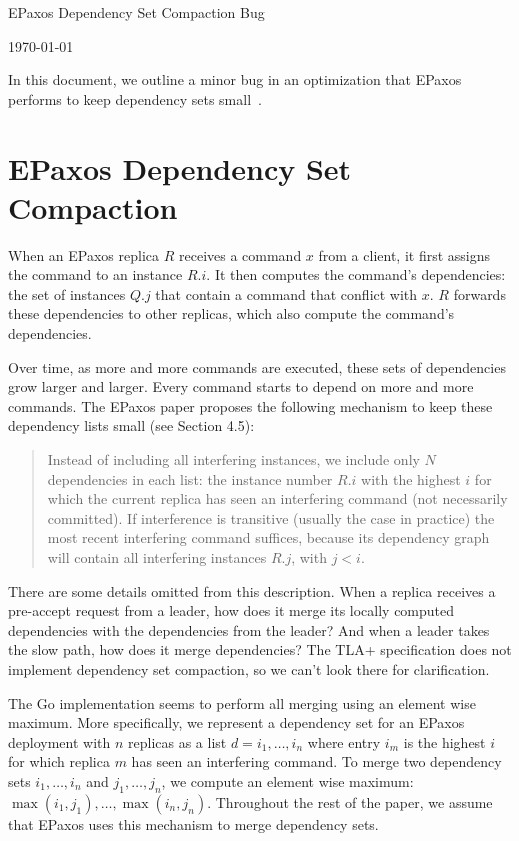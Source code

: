 \documentclass{mwhittaker}
\begin{document}
\begin{center}
  {\Huge EPaxos Dependency Set Compaction Bug}

  \today
\end{center}
In this document, we outline a minor bug in an optimization that EPaxos
performs to keep dependency sets small~\cite{moraru2013there, moraru2013proof}.

\section{EPaxos Dependency Set Compaction}
When an EPaxos replica $R$ receives a command $x$ from a client, it first
assigns the command to an instance $R.i$. It then computes the command's
dependencies: the set of instances $Q.j$ that contain a command that conflict
with $x$. $R$ forwards these dependencies to other replicas, which also compute
the command's dependencies.

Over time, as more and more commands are executed, these sets of dependencies
grow larger and larger. Every command starts to depend on more and more
commands. The EPaxos paper proposes the following mechanism to keep these
dependency lists small (see Section 4.5):

\begin{quote}
  Instead of including all interfering instances, we include only $N$
  dependencies in each list: the instance number $R.i$ with the highest $i$ for
  which the current replica has seen an interfering command (not necessarily
  committed). If interference is transitive (usually the case in practice) the
  most recent interfering command suffices, because its dependency graph will
  contain all interfering instances $R.j$, with $j < i$.
\end{quote}

There are some details omitted from this description. When a replica receives a
pre-accept request from a leader, how does it merge its locally computed
dependencies with the dependencies from the leader? And when a leader takes the
slow path, how does it merge dependencies? The TLA+ specification does not
implement dependency set compaction, so we can't look there for clarification.

The Go implementation seems to perform all merging using an element wise
maximum. More specifically, we represent a dependency set for an EPaxos
deployment with $n$ replicas as a list $d = i_1, \ldots, i_n$ where entry $i_m$
is the highest $i$ for which replica $m$ has seen an interfering command. To
merge two dependency sets $i_1, \ldots, i_n$ and $j_1, \ldots, j_n$, we compute
an element wise maximum: $\max(i_1, j_1), \ldots, \max(i_n, j_n)$.  Throughout
the rest of the paper, we assume that EPaxos uses this mechanism to merge
dependency sets.
\end{document}
